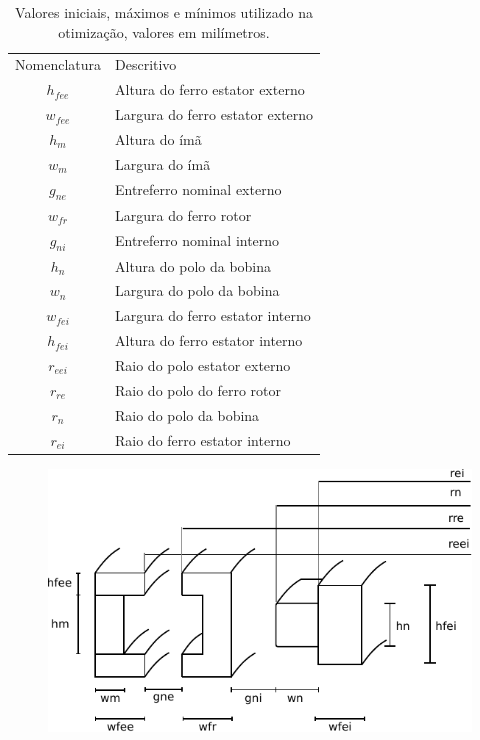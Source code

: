 \begin{table}[ht!]
	\centering
	\begin{tabular}{c l}
		Nomenclatura & Descritivo \\
		$h_{fee}$	& Altura do ferro estator externo \\
		$w_{fee}$	& Largura do ferro estator externo\\
		
		$h_m$		& Altura do ímã \\
		$w_m$		& Largura do ímã \\

		$g_{ne}$	& Entreferro nominal externo \\
		
		$w_{fr}$	& Largura do ferro rotor \\
		
		$g_{ni}$	& Entreferro nominal interno \\
		
		$h_n$		& Altura do polo da bobina \\
		$w_n$		& Largura do polo da bobina \\
		
		$w_{fei}$	& Largura do ferro estator interno \\
		$h_{fei}$	& Altura do ferro estator interno \\

		$r_{eei}$	& Raio do polo estator externo \\				
		$r_{re}$	& Raio do polo do ferro rotor \\		
		$r_{n}$		& Raio do polo da bobina \\		
		$r_{ei}$	& Raio do ferro estator interno \\		
		
	\end{tabular} 
	\caption{Valores iniciais, máximos e mínimos utilizado na otimização, valores em milímetros.}
	\label{tab:modelo:dimensoes:nomenclatura}
\end{table}


\begin{figure}[th!]
	\centering
	\includegraphics[width=0.8\linewidth]{Figs/modelo_dimensoes}
	\caption{}
	\label{fig:modelo_dimensoes}
\end{figure}

